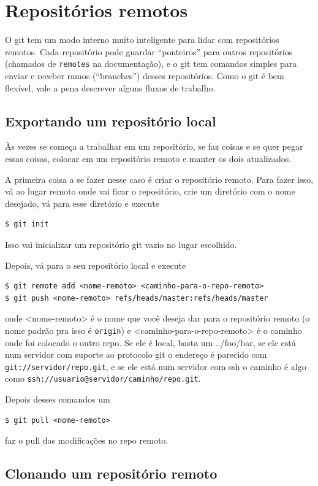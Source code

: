 \documentclass[12pt,brazil]{book}
\begin{document}
\section{Repositórios remotos}
\label{sec:remote}


O git tem um modo interno muito inteligente para lidar com
repositórios remotos. Cada repositório pode guardar ``ponteiros'' para
outros repositórios (chamados de \texttt{remotes} na documentação), e
o git tem comandos simples para enviar e receber ramos (``branches'')
desses repositórios. Como o git é bem flexível, vale a pena descrever
alguns fluxos de trabalho.

\subsection{Exportando um repositório local}
\label{sec:export-local}

Às vezes se começa a trabalhar em um repositório, se faz coisas e se
quer pegar essas coisas, colocar em um repositório remoto e manter os
dois atualizados.

A primeira coisa a se fazer nesse caso é criar o repositório
remoto. Para fazer isso, vá ao lugar remoto onde vai ficar o
repositório, crie um diretório com o nome desejado, vá para esse
diretório e execute
\begin{verbatim}
$ git init
\end{verbatim}
Isso vai inicializar um repositório git vazio no lugar escolhido.

Depois, vá para o seu repositório local e execute
\begin{verbatim}
$ git remote add <nome-remoto> <caminho-para-o-repo-remoto>
$ git push <nome-remoto> refs/heads/master:refs/heads/master
\end{verbatim}
onde <nome-remoto> é o nome que você deseja dar para o repositório
remoto (o nome padrão pra isso é \texttt{origin}) e
<caminho-para-o-repo-remoto> é o caminho onde foi colocado o outro
repo. Se ele é local, basta um ../foo/bar, se ele está num servidor
com suporte ao protocolo git o endereço é parecido com
\texttt{git://servidor/repo.git}, e se ele está num servidor com ssh o
caminho é algo como \texttt{ssh://usuario@servidor/caminho/repo.git}.

Depois desses comandos um
\begin{verbatim}
$ git pull <nome-remoto>
\end{verbatim}
faz o pull das modificações no repo remoto.

\subsection{Clonando um repositório remoto}
\label{sec:clone}
\end{document}
